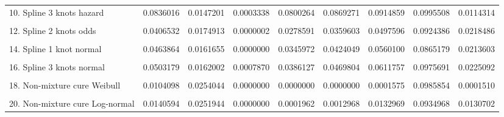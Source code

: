\documentclass[
]{article}
\begin{document}
\begin{table}
{\begin{tabular}[t]{lrrrrrrrr}
10. Spline 3 knots hazard & 0.0836016 & 0.0147201 & 0.0003338 & 0.0800264 & 0.0869271 & 0.0914859 & 0.0995508 & 0.0114314\\
\cellcolor{gray!6}{11. Spline 1 knot odds} & \cellcolor{gray!6}{0.0409936} & \cellcolor{gray!6}{0.0174573} & \cellcolor{gray!6}{0.0000002} & \cellcolor{gray!6}{0.0281200} & \cellcolor{gray!6}{0.0363732} & \cellcolor{gray!6}{0.0502873} & \cellcolor{gray!6}{0.0917083} & \cellcolor{gray!6}{0.0221153}\\
12. Spline 2 knots odds & 0.0406532 & 0.0174913 & 0.0000002 & 0.0278591 & 0.0359603 & 0.0497596 & 0.0924386 & 0.0218486\\
\cellcolor{gray!6}{13. Spline 3 knots odds} & \cellcolor{gray!6}{0.0496797} & \cellcolor{gray!6}{0.0176586} & \cellcolor{gray!6}{0.0003457} & \cellcolor{gray!6}{0.0357477} & \cellcolor{gray!6}{0.0465677} & \cellcolor{gray!6}{0.0637310} & \cellcolor{gray!6}{0.1000522} & \cellcolor{gray!6}{0.0279229}\\
14. Spline 1 knot normal & 0.0463864 & 0.0161655 & 0.0000000 & 0.0345972 & 0.0424049 & 0.0560100 & 0.0865179 & 0.0213603\\
\cellcolor{gray!6}{15. Spline 2 knots normal} & \cellcolor{gray!6}{0.0402267} & \cellcolor{gray!6}{0.0171793} & \cellcolor{gray!6}{0.0000005} & \cellcolor{gray!6}{0.0283428} & \cellcolor{gray!6}{0.0351282} & \cellcolor{gray!6}{0.0476188} & \cellcolor{gray!6}{0.0952194} & \cellcolor{gray!6}{0.0192267}\\
16. Spline 3 knots normal & 0.0503179 & 0.0162002 & 0.0007870 & 0.0386127 & 0.0469804 & 0.0611757 & 0.0975691 & 0.0225092\\
\cellcolor{gray!6}{17. Mixture cure Weibull} & \cellcolor{gray!6}{0.0103115} & \cellcolor{gray!6}{0.0253657} & \cellcolor{gray!6}{0.0000000} & \cellcolor{gray!6}{0.0000000} & \cellcolor{gray!6}{0.0000000} & \cellcolor{gray!6}{0.0001031} & \cellcolor{gray!6}{0.0987558} & \cellcolor{gray!6}{0.0000986}\\
18. Non-mixture cure Weibull & 0.0104098 & 0.0254044 & 0.0000000 & 0.0000000 & 0.0000000 & 0.0001575 & 0.0985854 & 0.0001510\\
\cellcolor{gray!6}{19. Mixture cure Log-normal} & \cellcolor{gray!6}{0.0135710} & \cellcolor{gray!6}{0.0252751} & \cellcolor{gray!6}{0.0000000} & \cellcolor{gray!6}{0.0000929} & \cellcolor{gray!6}{0.0008027} & \cellcolor{gray!6}{0.0116086} & \cellcolor{gray!6}{0.0931907} & \cellcolor{gray!6}{0.0114404}\\
20. Non-mixture cure Log-normal & 0.0140594 & 0.0251944 & 0.0000000 & 0.0001962 & 0.0012968 & 0.0132969 & 0.0934968 & 0.0130702\\

\end{tabular}}
\end{table}
\end{document}
